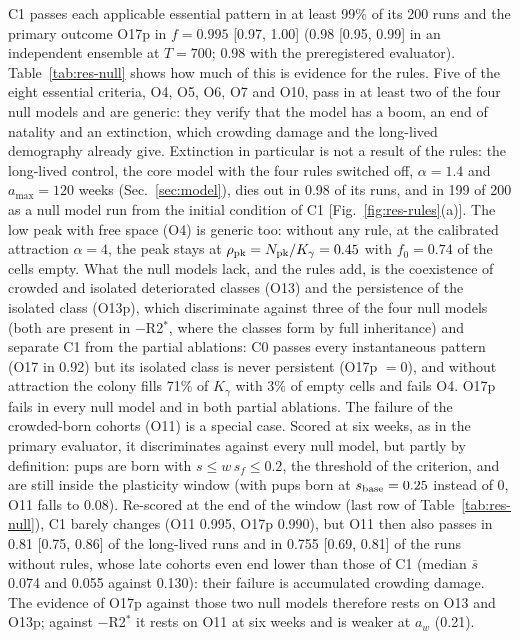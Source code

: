 \textsf{C1} passes each applicable essential pattern in at least 99\% of its 200 runs and the primary outcome
O17p in $f=0.995$ [0.97, 1.00] (0.98 [0.95, 0.99] in an independent ensemble at $T=700$; 0.98 with the
preregistered evaluator). Table~\ref{tab:res-null} shows how much of this is evidence for the rules. Five of the
eight essential criteria, O4, O5, O6, O7 and O10, pass in at least two of the four null models and are generic:
they verify that the model has a boom, an end of natality and an extinction, which crowding damage and the
long-lived demography already give. Extinction in particular is not a result of the rules: the long-lived
control, the core model with the four rules switched off, $\alpha=1.4$ and $a_{\max}=120$ weeks (Sec.~\ref{sec:model}),
dies out in 0.98 of its runs, and in 199 of 200 as a null model run from the initial condition of \textsf{C1}
[Fig.~\ref{fig:res-rules}(a)]. The low peak with free space (O4) is generic too: without any rule, at
the calibrated attraction $\alpha=4$, the peak stays at $\rho_{\rm pk}=N_{\rm pk}/K_\gamma=0.45$ with $f_0=0.74$
of the cells empty. What the null models lack, and the rules add, is the coexistence of crowded and isolated
deteriorated classes (O13) and the persistence of the isolated class (O13p), which discriminate against three of
the four null models (both are present in $-$R2$^*$, where the classes form by full inheritance) and separate
\textsf{C1} from the partial ablations: \textsf{C0} passes every instantaneous pattern (O17 in 0.92) but its
isolated class is never persistent (O17p $=0$), and without attraction the colony fills 71\% of $K_\gamma$ with
3\% of empty cells and fails O4. O17p fails in every null model and in both partial ablations. The failure of the
crowded-born cohorts (O11) is a special case. Scored at six weeks, as in the primary evaluator, it discriminates
against every null model, but partly by definition: pups are born with $s\le w\,s_f\le0.2$, the threshold of the
criterion, and are still inside the plasticity window (with pups born at $s_{\rm base}=0.25$ instead of 0, O11
falls to 0.08). Re-scored at the end of the window (last row of Table~\ref{tab:res-null}), \textsf{C1} barely
changes (O11 0.995, O17p 0.990), but O11 then also passes in 0.81 [0.75, 0.86] of the long-lived runs and in 0.755
[0.69, 0.81] of the runs without rules, whose late cohorts even end lower than those of \textsf{C1} (median
$\bar s$ 0.074 and 0.055 against 0.130): their failure is accumulated crowding damage. The evidence of O17p against
those two null models therefore rests on O13 and O13p; against $-$R2$^*$ it rests on O11 at six weeks and is weaker
at $a_w$ (0.21).


